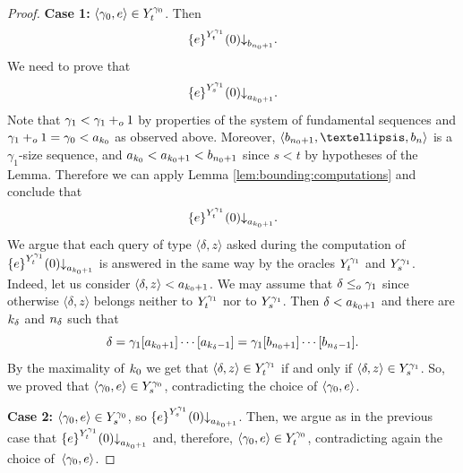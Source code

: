 \documentclass[10pt,a4paper]{amsart}
\def\la{\langle}
\newcommand{\leqo}{\leq\sb{o}}
\newcommand{\pluso}{+\sb{o}}
\def\ra{\rangle}
\newcommand{\set}[1]{{\{{#1}\}}}
\def\stops{{\downarrow}}
\begin{document}
\begin{proof}
\textbf{Case 1:} $\langle\gamma\sb0,e\rangle\in Y\sp{\gamma\sb0}\sb{t}$. 
Then
$$
\set{e}\sp{Y\sp{\gamma\sb 1}\sb{t}}(0)\stops\sb{b\sb{n\sb0+1}}.
$$
We need to prove that 
$$
\set{e}\sp{Y\sp{\gamma\sb 1}\sb{s}}(0)\stops\sb{a\sb{k\sb0+1}}.
$$
Note that $\gamma\sb 1 < \gamma\sb 1\pluso 1$ by properties of the system of fundamental sequences and $\gamma\sb 1\pluso 1 = \gamma_0 <a\sb{k\sb0}$ as observed above. Moreover, $\langle b\sb{n\sb0+1},\dots, b\sb n\rangle$ is a $\gamma_1$-size sequence, and $a\sb{k\sb0} < a\sb{k\sb0+1} < b\sb{n\sb0+1}$ since $s<t$ by hypotheses of the Lemma. 
Therefore we can apply Lemma \ref{lem:bounding:computations} and conclude that
$$
\set{e}\sp {Y\sp{\gamma\sb 1}\sb{t}}(0)\stops\sb{a\sb{k\sb0+1}}.
$$
We argue that each query of type $\langle\delta,z\rangle$ asked during the computation of $\set{e}\sp {Y\sp{\gamma\sb 1}\sb{t}}(0)\stops\sb{a\sb{k\sb0+1}}$ is answered in the same way by the oracles $Y\sp{\gamma\sb 1}\sb{t}$ and $Y\sp{\gamma\sb 1}\sb{s}$. 
Indeed, let us consider $\langle\delta, z\rangle<a\sb{k\sb0+1}$. 
We may assume that $\delta\leqo\gamma\sb 1$ since otherwise $\langle\delta,z\rangle$ belongs neither to $Y\sp{\gamma\sb 1}\sb{t}$ nor to $Y\sp{\gamma\sb 1}\sb{s}$. 
Then $\delta<a\sb{k\sb0+1}$ and there are $k\sb\delta$ and $n\sb\delta$ such that 
$$
\delta=\gamma\sb 1[a\sb{k\sb0+1}]\cdots [a\sb{k\sb\delta-1}]=
\gamma\sb 1[b\sb{n\sb0+1}]\cdots [b\sb{n\sb\delta-1}].
$$
By the maximality of $k\sb0$ we get that $\langle\delta,z\rangle\in Y\sp{\gamma\sb 1}\sb{t}$ if and only if $\langle\delta, z\rangle\in Y\sp{\gamma\sb 1}\sb{s}$.
So, we proved that $\la \gamma\sb0,e\ra\in Y\sp{\gamma\sb0}\sb{s}$, contradicting the choice of $\langle\gamma\sb0,e\rangle$.
\smallskip

\textbf{Case 2:} $\langle\gamma\sb0,e\rangle\in Y\sp{\gamma\sb0}\sb{s}$, so
$\set{e}\sp {Y\sp{\gamma\sb 1}\sb{s}}(0)\stops\sb{a\sb{k\sb0+1}}$.
Then, we argue as in the previous case that 
$\set{e}\sp{ Y\sp{\gamma\sb 1}\sb{t}}(0)\stops\sb{a\sb{k\sb0+1}}$ and, therefore, $\la\gamma\sb0,e\ra \in Y\sp{\gamma\sb0}\sb{t}$, contradicting again the choice of~$\langle\gamma\sb 0,e\rangle$.
\end{proof}
\end{document}
